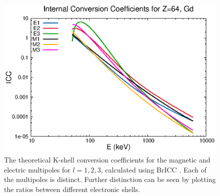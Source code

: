 \begin{figure}
    \centering
    \includegraphics[scale=1]{Introduction_Figs/ICCGd.eps}
    \caption{The theoretical K-shell conversion coefficients for the magnetic and electric multipoles for $l=1,2,3$, calculated using BrICC \citep{kibedi08:_BRICC}. Each of the multipoles is distinct. Further distinction can be seen by plotting the ratios between different electronic shells.}
    \label{fig:icc_gd}
\end{figure}